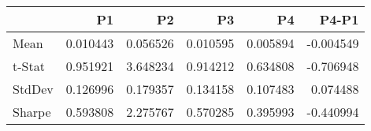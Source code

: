 \begin{tabular}{lrrrrr}
\toprule
 & P1 & P2 & P3 & P4 & P4-P1 \\
\midrule
Mean & 0.010443 & 0.056526 & 0.010595 & 0.005894 & -0.004549 \\
t-Stat & 0.951921 & 3.648234 & 0.914212 & 0.634808 & -0.706948 \\
StdDev & 0.126996 & 0.179357 & 0.134158 & 0.107483 & 0.074488 \\
Sharpe & 0.593808 & 2.275767 & 0.570285 & 0.395993 & -0.440994 \\
\bottomrule
\end{tabular}
